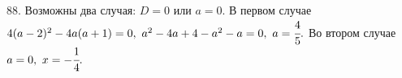 88. Возможны два случая: $D=0$ или $a=0.$ В первом случае $4(a-2)^2-4a(a+1)=0,\ a^2-4a+4-a^2-a=0,\ a=\cfrac{4}{5}.$ Во втором случае $a=0,\ x=-\cfrac{1}{4}.$\\
